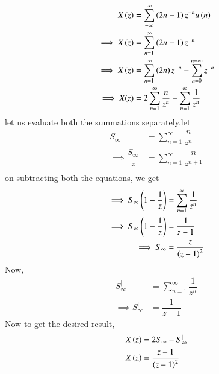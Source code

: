 \documentclass[journal,12pt,twocolumn]{IEEEtran}
\theoremstyle{remark}
\begin{document}
\begin{align}
    X\left(z\right)&=\sum_{-\infty}^{\infty}\left(2n-1\right)z^{-n}u\left(n\right) \\
   \implies X\left(z\right)&=\sum_{n=1}^{\infty}\left(2n-1\right)z^{-n} \\
   \implies X\left(z\right)&=\sum_{n=1}^{\infty}\left(2n\right)z^{-n} -\sum_{n=0}^{n=\infty}z^{-n}\\
   \implies X(z)&=2\sum_{n=1}^{\infty}\dfrac{n}{z^{n}}-\sum_{n=1}^{\infty}\dfrac{1}{z^{n}}
\end{align}
let us evaluate both the summations separately.let
\begin{align}
   S_\infty&=\sum_{n=1}^{\infty}\dfrac{n}{z^{n}}\\
   \implies \dfrac{S_\infty}{z}&=\sum_{n=1}^{\infty}\dfrac{n}{z^{n+1}}\\
\end{align}
on subtracting both the equations, we get
\begin{align}
   \implies S_\infty\left(1-\dfrac{1}{z}\right)&=\sum_{n=1}^{\infty}\dfrac{1}{z^{n}}\\
   \implies S_\infty\left(1-\dfrac{1}{z}\right)&=\dfrac{1}{z-1}\\
   \implies S_\infty&=\dfrac{z}{\left(z-1\right)^{2}}
\end{align}
Now,
\begin{align}
    S_{\infty}^{|}&=\sum_{n=1}^{\infty}\dfrac{1}{z^{n}}\\
    \implies S_{\infty}^{|}&=\dfrac{1}{z-1}
\end{align}
Now to get the desired result,
\begin{align}
    X\left(z\right)&=2S_\infty-S_{\infty}^{|}\\
    X\left(z\right)&=\dfrac{z+1}{\left(z-1\right)^{2}}
\end{align}
\end{document}
